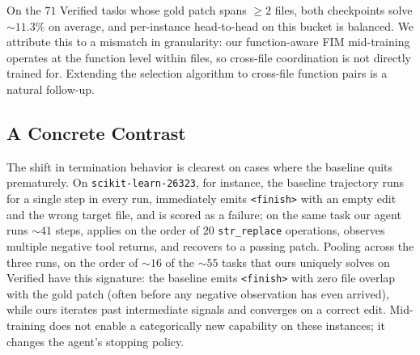 On the $71$ Verified tasks whose gold patch spans $\ge 2$ files, both
checkpoints solve $\sim\!11.3\%$ on average, and per-instance head-to-head
on this bucket is balanced. We attribute this to a mismatch in
granularity: our function-aware FIM mid-training operates at the
function level within files, so cross-file coordination is not directly
trained for. Extending the selection algorithm to cross-file function
pairs is a natural follow-up.

\subsection{A Concrete Contrast}
\label{app:behavior_extra:contrast}

The shift in termination behavior is clearest on cases where the
baseline quits prematurely. On \texttt{scikit-learn-26323}, for instance,
the baseline trajectory runs for a single step in every run, immediately
emits \texttt{<finish>} with an empty edit and the wrong target file,
and is scored as a failure; on the same task our agent runs $\sim\!41$
steps, applies on the order of $20$ \texttt{str\_replace} operations,
observes multiple negative tool returns, and recovers to a passing
patch. Pooling across the three runs, on the order of $\sim\!16$ of the
$\sim\!55$ tasks that ours uniquely solves on Verified have this
signature: the baseline emits \texttt{<finish>} with zero file overlap
with the gold patch (often before any negative observation has even
arrived), while ours iterates past intermediate signals and converges on
a correct edit. Mid-training does not enable a categorically new
capability on these instances; it changes the agent's stopping policy.